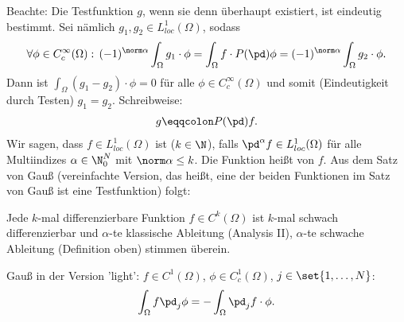 Beachte: Die Testfunktion $g$, wenn sie denn überhaupt existiert, ist eindeutig bestimmt. 
Sei nämlich $g_{1}, g_{2} \in L^{1}_{loc}(\Omega)$, sodass
\begin{align*}
  \forall \phi \in C_{c}^{\infty}(\Omega): \, (-1)^{\norm \alpha} \int_{\Omega} g_{1}\cdot\phi = \int_{\Omega} f \cdot P(\pd)\phi = (-1)^{\norm \alpha} \int_{\Omega} g_{2}\cdot\phi. 
\end{align*}
Dann ist $\int_{\Omega} (g_{1} - g_{2}) \cdot \phi = 0$ für alle $\phi \in C_{c}^{\infty}(\Omega)$ und somit (Eindeutigkeit durch Testen) $g_{1} = g_{2}$. Schreibweise:
\begin{align*}
  g \eqqcolon P(\pd)f. 
\end{align*}
Wir sagen, dass $f \in L^{1}_{loc}(\Omega)$  ist ($k \in \N$), falls $\pd^{\alpha}f \in L^{1}_{loc}(\Omega)$ für alle Multiindizes $\alpha \in \N_{0}^{N}$ mit $\norm \alpha \leq k$. Die Funktion heißt  von $f$. Aus dem Satz von Gauß (vereinfachte Version, das heißt, eine der beiden Funktionen im Satz von Gauß ist eine Testfunktion) folgt: 

Jede $k$-mal differenzierbare Funktion $f \in C^{k}(\Omega)$ ist $k$-mal schwach differenzierbar und $\alpha$-te klassische Ableitung (Analysis II), $\alpha$-te schwache Ableitung (Definition oben) stimmen überein. 

Gauß in der Version 'light': $f \in C^{1}(\Omega)$, $\phi \in C_{c}^{1}(\Omega)$, $j \in \set{1, \dots, N}$:
\begin{align*}
  \int_{\Omega} f\pd_{j}\phi = - \int_{\Omega}\pd_{j} f \cdot\phi. 
\end{align*}


